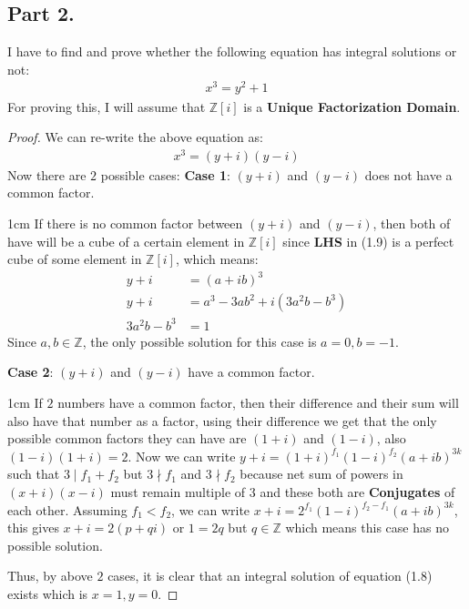 \documentclass{article}
\newenvironment{myenv}{\begin{adjustwidth}{1cm}{}}{\end{adjustwidth}}
\begin{document}
{  \subsection{Part 2.}{
    I have to find and prove whether the following equation has integral solutions or not:
    \begin{align}
      x^3=y^2+1 \label{eq:8}
    \end{align}
    For proving this, I will assume that $\mathbb{Z}[i]$ is a \textbf{Unique Factorization Domain}. \newline
    \begin{proof}
      We can re-write the above equation as:
      \begin{align}
        x^3=(y+i)(y-i) \label{eq:9}
      \end{align}
      Now there are $2$ possible cases: \newline
      \textbf{Case 1}: $(y+i)$ and $(y-i)$ does not have a common factor.
      \begin{myenv}
        If there is no common factor between $(y+i)$ and $(y-i)$, then both of have will be a cube of a certain element in $\mathbb{Z}[i]$ since \textbf{LHS} in (1.9) is a perfect cube of some element in $\mathbb{Z}[i]$, which means:
        \begin{align*}
          y+i&=(a+ib)^3 \\
          y+i&=a^3-3ab^2+i(3a^2b-b^3) \\
          3a^2b-b^3&=1
        \end{align*}
        Since $a,b \in \mathbb{Z}$, the only possible solution for this case is $a=0,b=-1$.
      \end{myenv}
      \textbf{Case 2}: $(y+i)$ and $(y-i)$ have a common factor.
      \begin{myenv}
        If $2$ numbers have a common factor, then their difference and their sum will also have that number as a factor, using their difference we get that the only possible common factors they can have are $(1+i)$ and $(1-i)$, also $(1-i)(1+i)=2$. \newline
        Now we can write $y+i=(1+i)^{f_1}(1-i)^{f_2}(a+ib)^{3k}$ such that $3 \mid f_1+f_2$ but $3 \nmid f_1$ and $3 \nmid f_2$ because net sum of powers in $(x+i)(x-i)$ must remain multiple of $3$ and these both are \textbf{Conjugates} of each other. \newline
        Assuming $f_1<f_2$, we can write $x+i=2^{f_1}(1-i)^{f_2-f_1}(a+ib)^{3k}$, this gives $x+i=2(p+qi)$ or $1=2q$ but $q \in \mathbb{Z}$ which means this case has no possible solution.
      \end{myenv}
      Thus, by above $2$ cases, it is clear that an integral solution of equation (1.8) exists which is $x=1,y=0$.
    \end{proof}
  }
}
\end{document}
